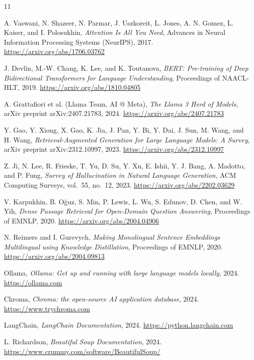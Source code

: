 \documentclass[]{ceurart}
\begin{document}
\begin{thebibliography}{11}

A. Vaswani, N. Shazeer, N. Parmar, J. Uszkoreit, L. Jones, A. N. Gomez,
L. Kaiser, and I. Polosukhin,
\textit{Attention Is All You Need},
Advances in Neural Information Processing Systems (NeurIPS), 2017.
\url{https://arxiv.org/abs/1706.03762}

J. Devlin, M.-W. Chang, K. Lee, and K. Toutanova,
\textit{BERT: Pre-training of Deep Bidirectional Transformers for Language
Understanding},
Proceedings of NAACL-HLT, 2019.
\url{https://arxiv.org/abs/1810.04805}

A. Grattafiori et al. (Llama Team, AI @ Meta),
\textit{The Llama 3 Herd of Models},
arXiv preprint arXiv:2407.21783, 2024.
\url{https://arxiv.org/abs/2407.21783}

Y. Gao, Y. Xiong, X. Gao, K. Jia, J. Pan, Y. Bi, Y. Dai, J. Sun, M. Wang,
and H. Wang,
\textit{Retrieval-Augmented Generation for Large Language Models: A Survey},
arXiv preprint arXiv:2312.10997, 2023.
\url{https://arxiv.org/abs/2312.10997}

Z. Ji, N. Lee, R. Frieske, T. Yu, D. Su, Y. Xu, E. Ishii, Y. J. Bang,
A. Madotto, and P. Fung,
\textit{Survey of Hallucination in Natural Language Generation},
ACM Computing Surveys, vol.~55, no.~12, 2023.
\url{https://arxiv.org/abs/2202.03629}

V. Karpukhin, B. O\u{g}uz, S. Min, P. Lewis, L. Wu, S. Edunov, D. Chen,
and W. Yih,
\textit{Dense Passage Retrieval for Open-Domain Question Answering},
Proceedings of EMNLP, 2020.
\url{https://arxiv.org/abs/2004.04906}

N. Reimers and I. Gurevych,
\textit{Making Monolingual Sentence Embeddings Multilingual using Knowledge
Distillation},
Proceedings of EMNLP, 2020.
\url{https://arxiv.org/abs/2004.09813}

Ollama,
\textit{Ollama: Get up and running with large language models locally},
2024.
\url{https://ollama.com}

Chroma,
\textit{Chroma: the open-source AI application database},
2024.
\url{https://www.trychroma.com}

LangChain,
\textit{LangChain Documentation},
2024.
\url{https://python.langchain.com}

L. Richardson,
\textit{Beautiful Soup Documentation},
2024.
\url{https://www.crummy.com/software/BeautifulSoup/}

\end{thebibliography}
\end{document}
